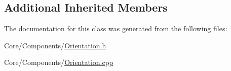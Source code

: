 \subsection*{Additional Inherited Members}


The documentation for this class was generated from the following files\-:\begin{DoxyCompactItemize}
\item 
Core/\-Components/\hyperlink{Orientation_8h}{Orientation.\-h}\item 
Core/\-Components/\hyperlink{Orientation_8cpp}{Orientation.\-cpp}\end{DoxyCompactItemize}
